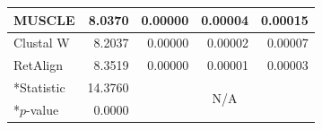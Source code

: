 \begin{table}[!h]
\begin{tabular}{|l|r||c|c|c|}
		\hline
		MUSCLE & 8.0370 & \multicolumn{1}{r|}{0.00000} & \multicolumn{1}{r|}{0.00004} & \multicolumn{1}{r|}{0.00015} \\
		\hline
		Clustal W & 8.2037 & \multicolumn{1}{r|}{0.00000} & \multicolumn{1}{r|}{0.00002} & \multicolumn{1}{r|}{0.00007} \\
		\hline
		RetAlign & 8.3519 & \multicolumn{1}{r|}{0.00000} & \multicolumn{1}{r|}{0.00001} & \multicolumn{1}{r|}{0.00003} \\
		\hline
		\hline
		*Statistic & 14.3760 & \multicolumn{3}{c|}{\multirow{2}{*}{N/A}} \\
		\cline{1-2}    *$p$-value & 0.0000 & \multicolumn{3}{c|}{} \\
		\hline
	\end{tabular}\label{tab:friedman_holm}\end{table}



